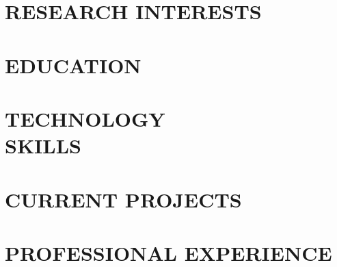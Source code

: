 \documentclass[margin, 10pt]{res} %
\begin{document}
\begin{resume}


\section{RESEARCH INTERESTS}


\vspace{-.5em}
\section{EDUCATION}


\vspace{-0.3em}
\section{TECHNOLOGY \\ SKILLS}


\vspace{-0.5em}
\section{CURRENT PROJECTS}



\vspace{-0.5em}
\section{PROFESSIONAL EXPERIENCE}



\end{resume}
\end{document}
